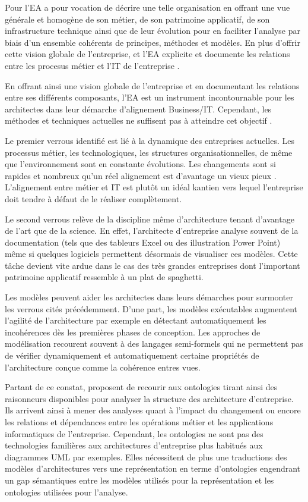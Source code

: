 	Pour \cite{lankhorst2013enterprise} l'EA a pour vocation de décrire une telle organisation en offrant une vue générale et homogène de son métier, de son patrimoine applicatif, de son infrastructure technique ainsi que de leur évolution pour en faciliter l'analyse par biais d'un ensemble cohérents de principes, méthodes et modèles. En plus d'offrir cette vision globale de l'entreprise, et  l'EA explicite et documente les relations entre les procesus métier et l'IT de l'entreprise \cite{kaisler_enterprise_2005}. 
	
	En offrant ainsi une vision globale de l'entreprise et en documentant les relations entre ses différents composants, l'EA est un instrument incontournable pour les architectes dans leur démarche d'alignement Business/IT. Cependant, les méthodes et techniques actuelles ne suffisent pas à atteindre cet objectif \cite{barn2013enterprise}. 
	
	Le premier verrous identifié est lié à la dynamique des entreprises actuelles. Les processus métier, les technologiques, les structures organisationnelles, de même que l'environnement sont en constante évolutions. Les changements sont si rapides et nombreux qu'un réel alignement est d'avantage un vieux pieux \cite{lankhorst2013enterprise}. L'alignement entre métier et IT est plutôt un idéal kantien vers lequel l'entreprise doit tendre à défaut de le réaliser complètement.
	
	Le second verrous relève de la discipline même d'architecture tenant d'avantage de l'art que de la science. En effet, l'architecte d'entreprise analyse souvent de la documentation (tels que des tableurs Excel ou des illustration Power Point) même si quelques logiciels permettent désormais de visualiser ces modèles. Cette tâche devient vite ardue dans le cas des très grandes entreprises dont l'important patrimoine applicatif ressemble à un plat de spaghetti.
	
	Les modèles peuvent aider les architectes dans leurs démarches pour surmonter les verrous cités précédemment. D'une part, les modèles exécutables augmentent l'agilité de l'architecture par exemple en détectant automatiquement les incohérences dès les premières phases de conception. Les approches de modélisation recourent souvent à des langages semi-formels qui ne permettent pas de vérifier dynamiquement et automatiquement certaine propriétés de l'architecture conçue comme la cohérence entres vues. 
	
	Partant de ce constat, \cite{sunkle_analyzing_2013} proposent de recourir aux ontologies tirant ainsi des raisonneurs disponibles pour analyser la structure des architecture d'entreprise. Ils arrivent ainsi à mener des analyses quant à l'impact du changement ou encore les relations et dépendances entre les opérations métier et les applications informatiques de l'entreprise. Cependant, les ontologies ne sont pas des technologies familières aux architectures d'entreprise plus habitués aux diagrammes UML par exemples. Elles nécessitent de plus une traductions des modèles d'architectures vers une représentation en terme d'ontologies engendrant un gap sémantiques entre les modèles utilisés pour la représentation et les ontologies utilisées pour l'analyse.
	
